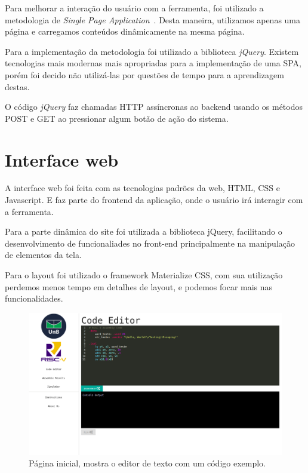 	Para melhorar a interação do usuário com a ferramenta, foi utilizado a metodologia de \textit{Single Page Application}~\cite{mikowski2013single}. Desta maneira, utilizamos apenas uma página e carregamos conteúdos dinâmicamente na mesma página.

	Para a implementação da metodologia foi utilizado a biblioteca \textit{jQuery}. Existem tecnologias mais modernas mais apropriadas para a implementação de uma SPA, porém foi decido não utilizá-las por questões de tempo para a aprendizagem destas.

	O código \textit{jQuery} faz chamadas HTTP assíncronas ao backend usando os métodos POST e GET ao pressionar algum botão de ação do sistema. 

\section{Interface web}

	A interface web foi feita com as tecnologias padrões da web, HTML, CSS e Javascript. E faz parte do frontend da aplicação, onde o usuário irá interagir com a ferramenta. 

	Para a parte dinâmica do site foi utilizada a biblioteca jQuery, facilitando o desenvolvimento de funcionaliades no front-end principalmente na manipulação de elementos da tela. 

	Para o layout foi utilizado o framework Materialize CSS, com sua utilização perdemos menos tempo em detalhes de layout, e podemos focar mais nas funcionalidades.

	\begin{figure}[h]
	  \includegraphics[width=\linewidth]{img/code_editor.png}
	  \caption{Página inicial, mostra o editor de texto com um código exemplo.}
	  \label{fig:editor_texto}
	\end{figure}

